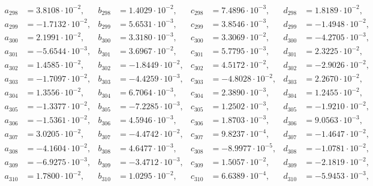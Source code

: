 \begin{align*}
  a_{ 298 } &= 3.8108 \cdot 10^{ -2 }, & b_{ 298 } &= 1.4029 \cdot 10^{ -2 }, & c_{ 298 } &= 7.4896 \cdot 10^{ -3 }, & d_{ 298 } &= 1.8189 \cdot 10^{ -2 }, \\ 
  a_{ 299 } &= -1.7132 \cdot 10^{ -2 }, & b_{ 299 } &= 5.6531 \cdot 10^{ -3 }, & c_{ 299 } &= 3.8546 \cdot 10^{ -3 }, & d_{ 299 } &= -1.4948 \cdot 10^{ -2 }, \\ 
  a_{ 300 } &= 2.1991 \cdot 10^{ -2 }, & b_{ 300 } &= 3.3180 \cdot 10^{ -3 }, & c_{ 300 } &= 3.3069 \cdot 10^{ -2 }, & d_{ 300 } &= -4.2705 \cdot 10^{ -3 }, \\ 
  a_{ 301 } &= -5.6544 \cdot 10^{ -3 }, & b_{ 301 } &= 3.6967 \cdot 10^{ -2 }, & c_{ 301 } &= 5.7795 \cdot 10^{ -3 }, & d_{ 301 } &= 2.3225 \cdot 10^{ -2 }, \\ 
  a_{ 302 } &= 1.4585 \cdot 10^{ -2 }, & b_{ 302 } &= -1.8449 \cdot 10^{ -2 }, & c_{ 302 } &= 4.5172 \cdot 10^{ -2 }, & d_{ 302 } &= -2.9026 \cdot 10^{ -2 }, \\ 
  a_{ 303 } &= -1.7097 \cdot 10^{ -2 }, & b_{ 303 } &= -4.4259 \cdot 10^{ -3 }, & c_{ 303 } &= -4.8028 \cdot 10^{ -2 }, & d_{ 303 } &= 2.2670 \cdot 10^{ -2 }, \\ 
  a_{ 304 } &= 1.3556 \cdot 10^{ -2 }, & b_{ 304 } &= 6.7064 \cdot 10^{ -3 }, & c_{ 304 } &= 2.3890 \cdot 10^{ -3 }, & d_{ 304 } &= 1.2455 \cdot 10^{ -2 }, \\ 
  a_{ 305 } &= -1.3377 \cdot 10^{ -2 }, & b_{ 305 } &= -7.2285 \cdot 10^{ -3 }, & c_{ 305 } &= 1.2502 \cdot 10^{ -3 }, & d_{ 305 } &= -1.9210 \cdot 10^{ -2 }, \\ 
  a_{ 306 } &= -1.5361 \cdot 10^{ -2 }, & b_{ 306 } &= 4.5946 \cdot 10^{ -3 }, & c_{ 306 } &= 1.8703 \cdot 10^{ -3 }, & d_{ 306 } &= 9.0563 \cdot 10^{ -3 }, \\ 
  a_{ 307 } &= 3.0205 \cdot 10^{ -2 }, & b_{ 307 } &= -4.4742 \cdot 10^{ -2 }, & c_{ 307 } &= 9.8237 \cdot 10^{ -4 }, & d_{ 307 } &= -1.4647 \cdot 10^{ -2 }, \\ 
  a_{ 308 } &= -4.1604 \cdot 10^{ -2 }, & b_{ 308 } &= 4.6477 \cdot 10^{ -3 }, & c_{ 308 } &= -8.9977 \cdot 10^{ -5 }, & d_{ 308 } &= -1.0781 \cdot 10^{ -2 }, \\ 
  a_{ 309 } &= -6.9275 \cdot 10^{ -3 }, & b_{ 309 } &= -3.4712 \cdot 10^{ -3 }, & c_{ 309 } &= 1.5057 \cdot 10^{ -2 }, & d_{ 309 } &= -2.1819 \cdot 10^{ -2 }, \\ 
  a_{ 310 } &= 1.7800 \cdot 10^{ -2 }, & b_{ 310 } &= 1.0295 \cdot 10^{ -2 }, & c_{ 310 } &= 6.6389 \cdot 10^{ -4 }, & d_{ 310 } &= -5.9453 \cdot 10^{ -3 }, \\ 

\end{align*}
